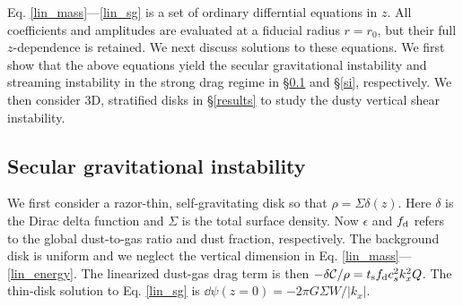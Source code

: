 
Eq. \ref{lin_mass}---\ref{lin_sg} is a set of ordinary
differntial equations in $z$. All coefficients and amplitudes are
evaluated at a fiducial radius $r=r_0$, but their full $z$-dependence
is retained. We next discuss solutions to these equations.  We first
show that the above equations yield the secular
gravitational instability and streaming instability in the strong
drag regime in \S\ref{sgi} and \S\ref{si}, respectively. We then
consider 3D, stratified disks in \S\ref{results} to study the dusty
vertical shear instability.

 


\subsection{Secular gravitational instability}\label{sgi}
We first consider a razor-thin, self-gravitating disk so that $\rho =
\Sigma\delta(z)$. Here $\delta$ is the Dirac delta function and $\Sigma$ is
the total surface density. Now $\epsilon$ and 
$f_\mathrm{d}$ refers to the global dust-to-gas ratio and dust 
fraction, respectively. The background disk is
uniform and we neglect the vertical dimension   
in Eq. \ref{lin_mass}---\ref{lin_energy}. The linearized dust-gas drag
term is then $-\delta\mathcal{C}/\rho = t_\mathrm{s}f_\mathrm{d} c_s^2k_x^2
Q$. The thin-disk solution to Eq. \ref{lin_sg} is $\dd\psi(z=0) = -2\pi G
\Sigma W/\left|k_x\right|$.%

